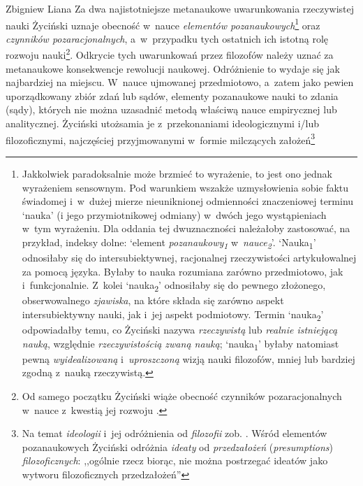 \begin{artplenv}{Zbigniew Liana}
Za dwa najistotniejsze metanaukowe uwarunkowania rzeczywistej nauki Życiński uznaje obecność w~nauce \textit{elementów
pozanaukowych}\footnote{Jakkolwiek paradoksalnie może brzmieć to wyrażenie, to jest ono jednak wyrażeniem sensownym.
Pod warunkiem wszakże uzmysłowienia sobie faktu świadomej i~w~dużej mierze nieuniknionej odmienności znaczeniowej
terminu `nauka' (i jego przymiotnikowej odmiany) w~dwóch jego wystąpieniach w~tym wyrażeniu. Dla oddania tej
dwuznaczności należałoby zastosować, na przykład, indeksy dolne: `element
\textit{pozanaukowy\textsubscript{1}} w~\textit{nauce\textsubscript{2}}'.
`Nauka\textsubscript{1}' odnosiłaby się do intersubiektywnej,
racjonalnej rzeczywistości artykułowalnej za pomocą języka. Byłaby to
nauka rozumiana zarówno przedmiotowo, jak i~funkcjonalnie. Z~kolei
`nauka\textsubscript{2}' odnosiłaby się do pewnego złożonego,
obserwowalnego \textit{zjawiska}, na które składa się zarówno aspekt intersubiektywny nauki, jak i~jej aspekt podmiotowy.
Termin `nauka\textsubscript{2}' odpowiadałby temu, co Życiński
nazywa \textit{rzeczywistą} lub \textit{realnie istniejącą nauką}, względnie
\textit{rzeczywistością zwaną nauką};
`nauka\textsubscript{1}' byłaby natomiast pewną \textit{wyidealizowaną} i~\textit{uproszczoną} wizją
nauki filozofów, mniej lub bardziej zgodną z~nauką rzeczywistą.} oraz
\textit{czynników pozaracjonalnych}, a~w~przypadku
tych ostatnich ich istotną rolę rozwoju nauki\footnote{Od samego początku Życiński wiąże obecność czynników
pozaracjonalnych w~nauce z~kwestią jej rozwoju
\parencite[zob.][s.~143]{zycinski_jezyk_1983}.
}. Odkrycie
tych uwarunkowań przez filozofów należy uznać za metanaukowe konsekwencje rewolucji naukowej. Odróżnienie to wydaje się
jak najbardziej na miejscu. W~nauce ujmowanej przedmiotowo, a~zatem jako pewien uporządkowany zbiór zdań lub sądów,
elementy pozanaukowe nauki to zdania (sądy), których nie można uzasadnić metodą właściwą nauce empirycznej lub
analitycznej. Życiński utożsamia je z~przekonaniami ideologicznymi i/lub filozoficznymi, najczęściej przyjmowanymi w~formie
milczących założeń\footnote{Na temat \textit{ideologii} i~jej odróżnienia od \textit{filozofii}
zob. \parencites[s.~18]{zycinski_structure_1988}[s.~33]{zycinski_struktura_2013}.
Wśród elementów pozanaukowych
Życiński odróżnia \textit{ideaty} od \textit{przedzałożeń} (\textit{presumptions}) \textit{filozoficznych}: ,,ogólnie rzecz
biorąc, nie można postrzegać ideatów jako wytworu filozoficznych przedzałożeń''
}
\end{artplenv}

